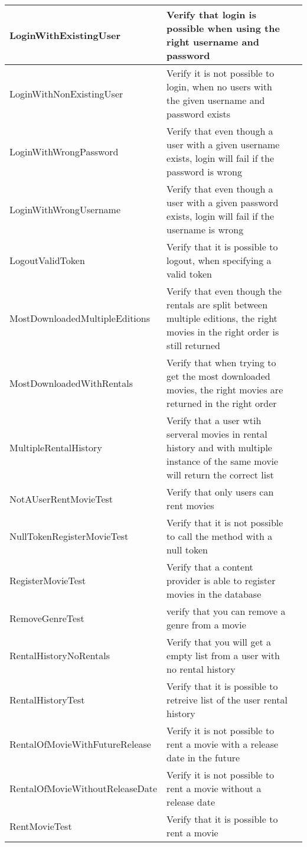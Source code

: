 \begin{centering}
\begin{longtable}{| p{5 cm} | p{7 cm} | c |}
\hline
LoginWithExistingUser & Verify that login is possible when using the right username and password & \\
\hline
LoginWithNonExistingUser & Verify it is not possible to login, when no users with the given username and password exists & \\
\hline
LoginWithWrongPassword & Verify that even though a user with a given username exists, login will fail if the password is wrong & \\
\hline
LoginWithWrongUsername & Verify that even though a user with a given password exists, login will fail if the username is wrong & \\
\hline
LogoutValidToken & Verify that it is possible to logout, when specifying a valid token & \\
\hline
MostDownloadedMultipleEditions & Verify that even though the rentals are split between multiple editions, the right movies in the right order is still returned & \\
\hline
MostDownloadedWithRentals & Verify that when trying to get the most downloaded movies, the right movies are returned in the right order & \\
\hline
MultipleRentalHistory & Verify that a user wtih serveral movies in rental history and with multiple instance of the same movie will return the correct list & \\
\hline
NotAUserRentMovieTest & Verify that only users can rent movies & \\
\hline
NullTokenRegisterMovieTest & Verify that it is not possible to call the method with a null token & \\
\hline
RegisterMovieTest & Verify that a content provider is able to register movies in the database & \\
\hline
RemoveGenreTest & verify that you can remove a genre from a movie & \\
\hline
RentalHistoryNoRentals & Verify that you will get a empty list from a user with no rental history & \\
\hline
RentalHistoryTest & Verify that it is possible to retreive list of the user rental history & \\
\hline
RentalOfMovieWithFutureRelease & Verify it is not possible to rent a movie with a release date in the future & \\
\hline
RentalOfMovieWithoutReleaseDate & Verify it is not possible to rent a movie without a release date & \\
\hline
RentMovieTest & Verify that it is possible to rent a movie & \\

\end{longtable}
\end{centering}
